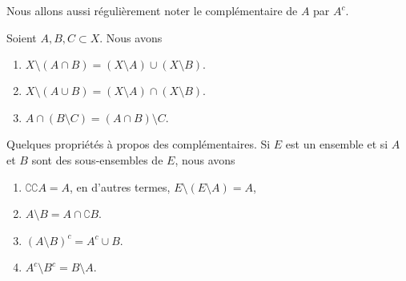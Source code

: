 Nous allons aussi régulièrement noter le complémentaire de \( A\) par \( A^c\).

\begin{lemma}       \label{LEMooHRKAooRskzQL}
    Soient \( A,B,C\subset X\). Nous avons
    \begin{enumerate}
        \item
            $X\setminus(A\cap B)=(X\setminus A)\cup(X\setminus B).$
        \item       \label{ITEMooQCGUooKnWfBo}
            \( X\setminus (A\cup B)=(X\setminus A)\cap(X\setminus B)\).
        \item       \label{ITEMooXWKCooUASxlh}
            \( A\cap(B\setminus C)=(A\cap B)\setminus C\).
    \end{enumerate}
\end{lemma}

\begin{lemma}		\label{LemPropsComplement}
	Quelques propriétés à propos des complémentaires. Si $E$ est un ensemble et si $A$ et $B$ sont des sous-ensembles de $E$, nous avons
	\begin{enumerate}
		\item
			$\complement \complement A =A $, en d'autres termes, $E\setminus(E\setminus A)=A$,
		\item	\label{ItemLemPropComplementiii}
			$A\setminus B=A\cap\complement B$.
        \item       \label{ITEMooNHDUooWtURqQ}
            \( (A\setminus B)^c=A^c\cup B\).
        \item       \label{ITEMooTBWKooTChOmC}
            \( A^c\setminus B^c=B\setminus A\).
	\end{enumerate}
\end{lemma}


